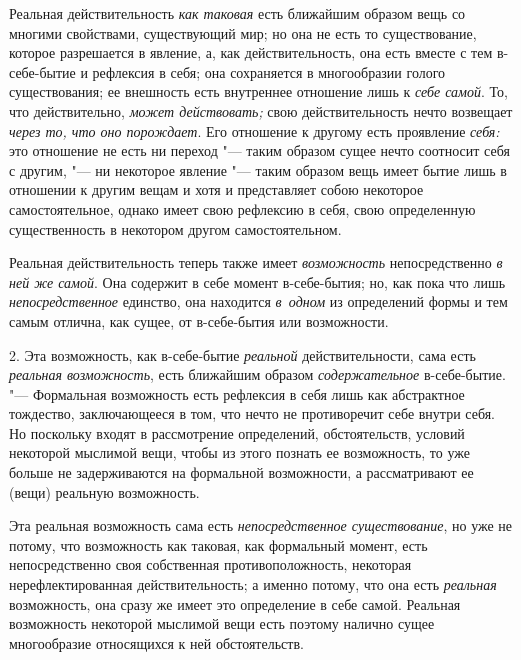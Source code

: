 Реальная действительность {\em как таковая} есть
ближайшим образом вещь со многими свойствами, существующий мир; но она не
есть то существование, которое разрешается в явление, а, как
действительность, она есть вместе с тем в-себе-бытие и рефлексия в себя;
она сохраняется в многообразии голого существования; ее внешность есть
внутреннее отношение лишь к {\em себе самой}. То, что
действительно, {\em может действовать;} свою
действительность нечто возвещает {\em через то, что оно
порождает}. Его отношение к другому есть проявление
{\em себя:} это отношение не есть ни переход "--- таким образом сущее
нечто соотносит себя с другим, "--- ни некоторое явление "--- таким
образом вещь имеет бытие лишь в отношении к другим вещам и хотя и
представляет собою некоторое самостоятельное, однако имеет свою рефлексию
в себя, свою определенную существенность в некотором другом самостоятельном.

Реальная действительность теперь также имеет {\em возможность} непосредственно
{\em в ней же самой}. Она содержит в себе момент в-себе-бытия; но, как
пока что лишь {\em непосредственное} единство, она находится {\em в~одном}
из определений формы и тем самым отлична, как сущее, от в-себе-бытия или
возможности.

2. Эта возможность, как в-себе-бытие {\em реальной}
действительности, сама есть {\em реальная возможность},
есть ближайшим образом {\em содержательное}
в-себе-бытие. "--- Формальная возможность есть рефлексия в себя лишь как
абстрактное тождество, заключающееся в том, что нечто не противоречит себе
внутри себя. Но поскольку входят в рассмотрение определений, обстоятельств,
условий некоторой мыслимой вещи, чтобы из этого познать ее возможность, то
уже больше не задерживаются на формальной возможности, а рассматривают ее
(вещи) реальную возможность.

Эта реальная возможность сама есть {\em непосредственное
существование}, но уже не потому, что возможность как таковая, как
формальный момент, есть непосредственно своя собственная противоположность,
некоторая нерефлектированная действительность; а именно потому, что она
есть {\em реальная} возможность, она сразу же имеет это
определение в себе самой. Реальная возможность некоторой мыслимой вещи есть
поэтому налично сущее многообразие относящихся к ней обстоятельств.

